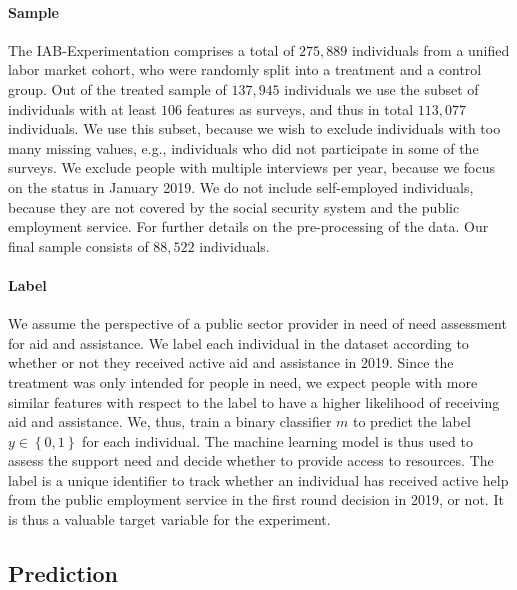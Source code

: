 \documentclass{article} %
\begin{document}
\paragraph{Sample}
The IAB-Experimentation comprises a total of $275{,}889$ individuals from a unified labor market cohort, who were randomly split into a treatment and a control group. Out of the treated sample of $137{,}945$ individuals we use the subset of individuals with at least $106$ features as surveys, and thus in total $113{,}077$ individuals. We use this subset, because we wish to exclude individuals with too many missing values, e.g., individuals who did not participate in some of the surveys. We exclude people with multiple interviews per year, because we focus on the status in January 2019. We do not include self-employed individuals, because they are not covered by the social security system and the public employment service. For further details on the pre-processing of the data. Our final sample consists of $88{,}522$ individuals.


\paragraph{Label}
We assume the perspective of a public sector provider in need of need assessment for aid and assistance. We label each individual in the dataset according to whether or not they received active aid and assistance in 2019. Since the treatment was only intended for people in need, we expect people with more similar features with respect to the label to have a higher likelihood of receiving aid and assistance. We, thus, train a binary classifier $m$ to predict the label $y \in \left\{ 0, 1 \right\}$ for each individual. The machine learning model is thus used to assess the support need and decide whether to provide access to resources. The label is a unique identifier to track whether an individual has received active help from the public employment service in the first round decision in 2019, or not. It is thus a valuable target variable for the experiment.

\subsection{Prediction}
\label{sec:prediction}
\end{document}
